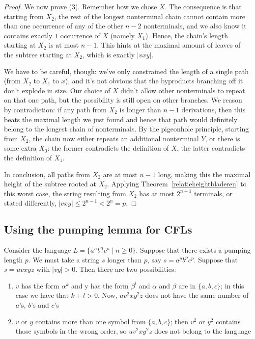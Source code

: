 \begin{proof}
\medskip
We now prove (3). Remember how we chose $X$. The consequence is that starting from $X_2$, the rest of the longest nonterminal chain cannot contain more than one occurrence of any of the other $n-2$ nonterminals, and we also know it contains exactly $1$ occurrence of $X$ (namely $X_1$). Hence, the chain's length starting at $X_2$ is at most $n-1$. This hints at the maximal amount of leaves of the subtree starting at $X_2$, which is exactly $|vxy|$.

\medskip
We have to be careful, though: we've only constrained the length of a single path (from $X_2$ to $X_1$ to $x$), and it's not obvious that the byproducts branching off it don't explode in size. Our choice of $X$ didn't allow other nonterminals to repeat on that one path, but the possibility is still open on other branches. We reason by contradiction: if any path from $X_2$ is longer than $n-1$ derivations, then this beats the maximal length we just found and hence that path would definitely belong to the longest chain of nonterminals. By the pigeonhole principle, starting from $X_2$, the chain now either repeats an additional nonterminal $Y$, or there is some extra $X_0$: the former contradicts the definition of $X$, the latter contradicts the definition of $X_1$. 

\medskip
In conclusion, all paths from $X_2$ are at most $n-1$ long, making this the maximal height of the subtree rooted at $X_2$. Applying Theorem~\ref{relatieheightbladeren} to this worst case, the string resulting from $X_2$ has at most $2^{n-1}$ terminals, or stated differently, $|vxy|\leq 2^{n-1} < 2^n = p$.
\end{proof}

\subsection{Using the pumping lemma for CFLs}\label{voorbeeldpompcfl}
Consider the language $L = \{a^nb^nc^n \mid n \geq 0\}$. Suppose that
there exists a pumping length $p$. We must take a string $s$ longer than
$p$, say $s = a^pb^pc^p$.  Suppose that $s = uvxyz$ with $|vy| >
0$. Then there are two possibilities:
\begin{enumerate}
\item $v$ has the form $\alpha^k$ and y has the form $\beta^l$ and
$\alpha$ and $\beta$ are in $\{a,b,c\}$; in this case we have that
$k+l > 0$. Now, $uv^2xy^2z$ does not have the same number of $a$'s, $b$'s
and $c$'s

\item $v$ or $y$ contains more than one symbol from $\{a,b,c\}$; then $v^2$ or
$y^2$ contains those symbols in the wrong order, so $uv^2xy^2z$ does not belong to the language

\end{enumerate}

